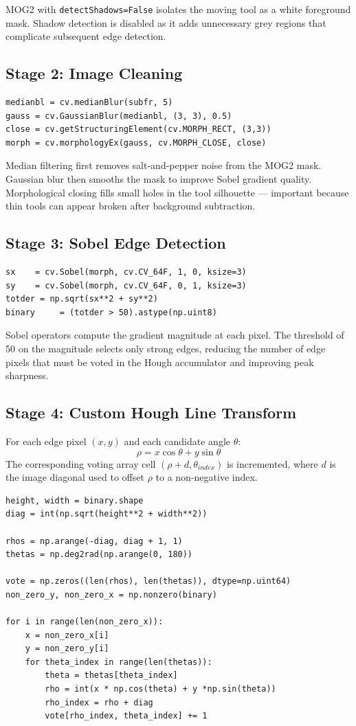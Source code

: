 \documentclass[journal]{IEEEtran}
\begin{document}
MOG2 with \texttt{detectShadows=False} isolates the moving tool as a white 
foreground mask. Shadow detection is disabled as it adds unnecessary grey 
regions that complicate subsequent edge detection.

\subsection{Stage 2: Image Cleaning}
\begin{lstlisting}
medianbl = cv.medianBlur(subfr, 5)
gauss = cv.GaussianBlur(medianbl, (3, 3), 0.5)
close = cv.getStructuringElement(cv.MORPH_RECT, (3,3))
morph = cv.morphologyEx(gauss, cv.MORPH_CLOSE, close)
\end{lstlisting}

Median filtering first removes salt-and-pepper noise from the MOG2 mask. 
Gaussian blur then smooths the mask to improve Sobel gradient quality. 
Morphological closing fills small holes in the tool silhouette — important 
because thin tools can appear broken after background subtraction.

\subsection{Stage 3: Sobel Edge Detection}
\begin{lstlisting}
sx    = cv.Sobel(morph, cv.CV_64F, 1, 0, ksize=3)
sy    = cv.Sobel(morph, cv.CV_64F, 0, 1, ksize=3)
totder = np.sqrt(sx**2 + sy**2)
binary     = (totder > 50).astype(np.uint8)
\end{lstlisting}

Sobel operators compute the gradient magnitude at each pixel. The threshold 
of 50 on the magnitude selects only strong edges, reducing the number of 
edge pixels that must be voted in the Hough accumulator and improving 
peak sharpness.

\subsection{Stage 4: Custom Hough Line Transform}
For each edge pixel $(x, y)$ 
and each candidate angle $\theta$:
\begin{equation}
\rho = x\cos\theta + y\sin\theta
\end{equation}
The corresponding voting array cell $(\rho + d, \theta_{index})$ is incremented, 
where $d$ is the image diagonal used to offset $\rho$ to a non-negative index.

\begin{lstlisting}
height, width = binary.shape
diag = int(np.sqrt(height**2 + width**2))

rhos = np.arange(-diag, diag + 1, 1)
thetas = np.deg2rad(np.arange(0, 180))

vote = np.zeros((len(rhos), len(thetas)), dtype=np.uint64)
non_zero_y, non_zero_x = np.nonzero(binary)

for i in range(len(non_zero_x)):
    x = non_zero_x[i]
    y = non_zero_y[i]
    for theta_index in range(len(thetas)):
        theta = thetas[theta_index]
        rho = int(x * np.cos(theta) + y *np.sin(theta))
        rho_index = rho + diag
        vote[rho_index, theta_index] += 1
\end{lstlisting}
\end{document}
